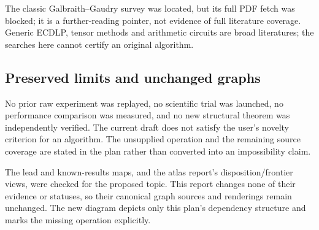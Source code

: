 \documentclass[
  10pt,
]{article}
\begin{document}
The classic Galbraith--Gaudry survey was located, but its full PDF fetch
was blocked; it is a further-reading pointer, not evidence of full
literature coverage. Generic ECDLP, tensor methods and arithmetic
circuits are broad literatures; the searches here cannot certify an
original algorithm.

\subsection{Preserved limits and unchanged
graphs}\label{preserved-limits-and-unchanged-graphs}

No prior raw experiment was replayed, no scientific trial was launched,
no performance comparison was measured, and no new structural theorem
was independently verified. The current draft does not satisfy the
user's novelty criterion for an algorithm. The unsupplied operation and
the remaining source coverage are stated in the plan rather than
converted into an impossibility claim.

The lead and known-results maps, and the atlas report's
disposition/frontier views, were checked for the proposed topic. This
report changes none of their evidence or statuses, so their canonical
graph sources and renderings remain unchanged. The new diagram depicts
only this plan's dependency structure and marks the missing operation
explicitly.
\end{document}
